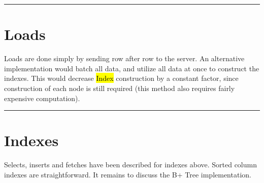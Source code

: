 \documentclass[paper=letter, fontsize=11pt]{scrartcl}
\numberwithin{equation}{section}
\numberwithin{figure}{section}
\numberwithin{table}{section}
\newcommand{\horrule}[1]{\rule{\linewidth}{#1}}
\newcommand{\ttt}[1]{\hl{\ttfamily #1}}
\begin{document}
\horrule{0.5pt}
\section{Loads}
Loads are done simply by sending row after row to the server.  An alternative implementation would batch all data, and utilize all data at once to construct the indexes.  This would decrease \ttt{Index} construction by a constant factor, since construction of each node is still required (this method also requires fairly expensive computation).

\horrule{0.5pt}
\section{Indexes}
Selects, inserts and fetches have been described for indexes above.  Sorted column indexes are straightforward.  It remains to discuss the B+ Tree implementation.
\end{document}
